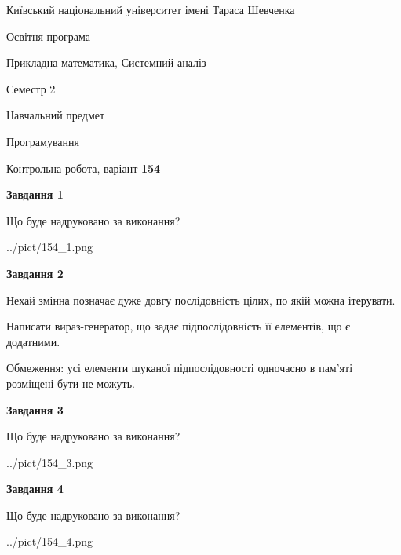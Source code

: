 \documentclass[12pt, ukrainian]{article}
\begin{document}
{{\begin {small}\par
{ \center  Київський національний університет імені Тараса Шевченка \par}
{\parbox {5 cm}{Освітня програма \hfill}{\parbox {8 cm}{Прикладна математика, Системний аналіз \hfill}}\parbox {5 cm}{\hfill Семестр 2}}\par
{\parbox {5 cm} {Навчальний предмет \hfill}\parbox {7 cm}{Програмування \hfill}\parbox {6cm}{\hfill}\par}\vspace{-7pt} \end{small}}{\center Контрольна робота, варіант  \No \textbf
{ 154 }\par}}
{
\begin {large}
{\begin {center}\textbf{Завдання 1}\end {center}}\par
Що буде надруковано за виконання?\par\par
\begin{center}
	{../pict/154_1.png}
\end{center}
\newpage

{\begin {center}\textbf{Завдання 2}\end {center}}\par
Нехай змінна  позначає дуже довгу послідовність цілих, по якій можна ітерувати.

Написати вираз-генератор, що задає підпослідовність її елементів, що є додатни\-ми.

Обмеження: усі елементи шуканої підпослідовності одночасно в пам'яті розміщені бути не можуть.\par
\newpage

{\begin {center}\textbf{Завдання 3}\end {center}}\par
Що буде надруковано за виконання?\par
\begin{center}
	{../pict/154_3.png}
\end{center}
\newpage

{\begin {center}\textbf{Завдання 4}\end {center}}\par
Що буде надруковано за виконання?\par
\begin{center}
	{../pict/154_4.png}
\end{center}
\newpage


\end{large}}
\end{document}
